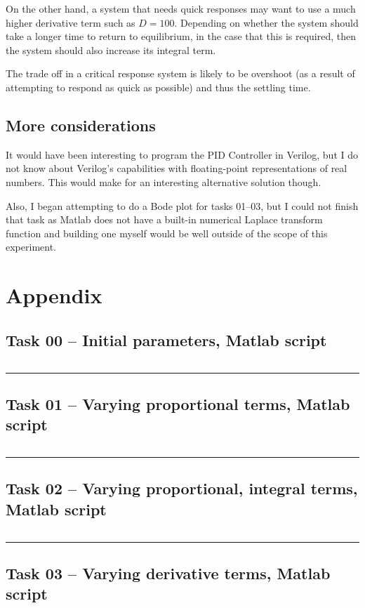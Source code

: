 \documentclass[12pt]{article}
\def\hr{{\par\noindent\rule{\textwidth}{0.4pt}}}
\begin{document}
On the other hand, a system that needs quick responses may want to use a much higher derivative term such as $D=100$. Depending on whether the system should take a longer time to return to equilibrium, in the case that this is required, then the system should also increase its integral term.

The trade off in a critical response system is likely to be overshoot (as a result of attempting to respond as quick as possible) and thus the settling time.

\subsection{More considerations}

It would have been interesting to program the PID Controller in Verilog,
but I do not know about Verilog's capabilities with floating-point representations of real numbers.
This would make for an interesting alternative solution though.

Also, I began attempting to do a Bode plot for tasks 01--03,
but I could not finish that task
as Matlab does not have a built-in numerical Laplace transform function
and building one myself would be well outside of the scope of this experiment.

\newpage
\printbibliography

\newpage
\appendix
\section{Appendix}\label{app}

\subsection{Task 00 -- Initial parameters, Matlab script}\label{sap:initial params}
\inputminted{matlab}{src/lab09_task00_initial_dc_motor_motor_params.m}

\hr{}

\subsection{Task 01 -- Varying proportional terms, Matlab script}\label{sap:vary p}
\inputminted{matlab}{src/lab09_task01_vary_p.m}

\hr{}

\subsection{Task 02 -- Varying proportional, integral terms, Matlab script}\label{sap:vary pi}
\inputminted{matlab}{src/lab09_task02_vary_i.m}

\hr{}

\subsection{Task 03 -- Varying derivative terms, Matlab script}\label{sap:vary d}
\inputminted{matlab}{src/lab09_task03_vary_d.m}
\end{document}
